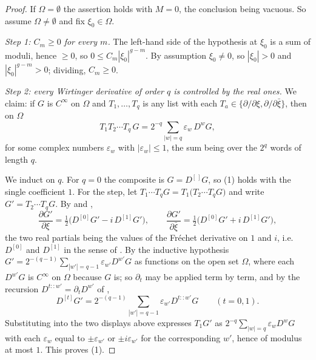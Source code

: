 \begin{proof}
If $\Omega=\emptyset$ the assertion holds with $M=0$, the conclusion being
vacuous.  So assume $\Omega\neq\emptyset$ and fix $\xi_0\in\Omega$.

\emph{Step 1: $C_m\ge0$ for every $m$.}  The left-hand side of the hypothesis
at $\xi_0$ is a sum of moduli, hence $\ge0$, so
$0\le C_m|\xi_0|^{g-m}$.  By assumption $\xi_0\neq0$, so $|\xi_0|>0$ and
$|\xi_0|^{g-m}>0$; dividing, $C_m\ge0$.

\emph{Step 2: every Wirtinger derivative of order $q$ is controlled by the
real ones.}  We claim: if $G$ is $C^\infty$ on $\Omega$ and $T_1,\dots,T_q$ is
any list with each $T_a\in\{\partial/\partial\xi,\partial/\partial\bar\xi\}$,
then on $\Omega$
\begin{equation}\tag{1}
  T_1T_2\cdots T_q\,G=2^{-q}\sum_{|w|=q}\varepsilon_w\,D^{w}G,
\end{equation}
for some complex numbers $\varepsilon_w$ with $|\varepsilon_w|\le1$, the sum
being over the $2^q$ words of length $q$.

We induct on $q$.  For $q=0$ the composite is $G=D^{[\,]}G$, so (1) holds with
the single coefficient $1$.  For the step, let $T_1\cdots T_qG=T_1\bigl(T_2\cdots T_qG\bigr)$
and write $G'=T_2\cdots T_qG$.  By  and ,
\[
  \frac{\partial G'}{\partial\xi}
    =\tfrac12\bigl(D^{[0]}G'-i\,D^{[1]}G'\bigr),\qquad
  \frac{\partial G'}{\partial\bar\xi}
    =\tfrac12\bigl(D^{[0]}G'+i\,D^{[1]}G'\bigr),
\]
the two real partials being the values of the Fréchet derivative on $1$ and
$i$, i.e.\ $D^{[0]}$ and $D^{[1]}$ in the sense of .  By
the inductive hypothesis $G'=2^{-(q-1)}\sum_{|w'|=q-1}\varepsilon_{w'}D^{w'}G$
as functions on the open set $\Omega$, where each $D^{w'}G$ is $C^\infty$ on
$\Omega$ because $G$ is; so $\partial_t$ may be applied term by term, and by
the recursion $D^{t::w'}=\partial_t D^{w'}$ of ,
\[
  D^{[t]}G'=2^{-(q-1)}\sum_{|w'|=q-1}\varepsilon_{w'}D^{t::w'}G
  \qquad(t=0,1).
\]
Substituting into the two displays above expresses $T_1G'$ as
$2^{-q}\sum_{|w|=q}\varepsilon_wD^{w}G$ with each $\varepsilon_w$ equal to
$\pm\varepsilon_{w'}$ or $\pm i\varepsilon_{w'}$ for the corresponding $w'$,
hence of modulus at most $1$.  This proves (1).


\end{proof}
